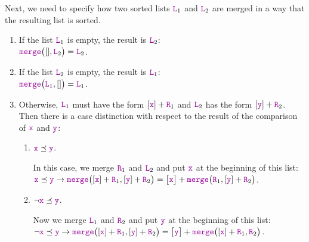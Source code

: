 Next, we need to specify how two sorted lists $\mytt{L}_1$ and $\mytt{L}_2$ are merged in a way that the resulting list
is sorted.
\begin{enumerate}
\item If the list $\mytt{L}_1$ is empty, the result is $\mytt{L}_2$: \\[0.2cm]
      \hspace*{1.3cm} 
      $\mytt{merge}\bigl([], \mytt{L}_2\bigr) = \mytt{L}_2$.
\item If the list $\mytt{L}_2$  is empty, the result is $\mytt{L}_1$: \\[0.2cm]
      \hspace*{1.3cm} 
      $\mytt{merge}\bigl(\mytt{L}_1, []\bigr) = \mytt{L}_1$.
\item Otherwise, $\mytt{L}_1$ must have the form $[\mytt{x}] + \mytt{R}_1$ and $\mytt{L}_2$ has the form $[\mytt{y}] +\mytt{R}_2$.
      Then there is a case distinction with respect to the result of the comparison of $\mytt{x}$ and $\mytt{y}$:
      \begin{enumerate}
      \item $\mytt{x} \preceq \mytt{y}$.

            In this case, we merge $\mytt{R}_1$ and $\mytt{L}_2$ and put $\mytt{x}$ at the beginning of this list:
            \\[0.2cm]
            \hspace*{1.3cm} 
            $\mytt{x} \preceq \mytt{y} \rightarrow \mytt{merge}\bigl([\mytt{x}] + \mytt{R}_1, [\mytt{y}] + \mytt{R}_2\bigr) = \bigl[\mytt{x}\bigr] +
            \mytt{merge}\bigl(\mytt{R}_1,[\mytt{y}] + \mytt{R}_2\bigr)$.
      \item $\neg \mytt{x} \preceq \mytt{y}$.

            Now we merge $\mytt{L}_1$ and $\mytt{R}_2$ and put $\mytt{y}$ at the beginning of this list:
            \\[0.2cm]
            \hspace*{1.3cm} 
            $\neg \mytt{x} \preceq \mytt{y} \rightarrow \mytt{merge}\bigl([\mytt{x}] + \mytt{R}_1, [\mytt{y}] + \mytt{R}_2\bigr) = \bigl[\mytt{y} \bigr] +
             \mytt{merge}\bigl([\mytt{x}] + \mytt{R}_1,\mytt{R}_2\bigr)$.
      \end{enumerate}
\end{enumerate}

